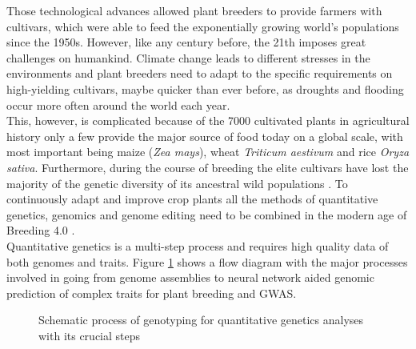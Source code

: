 Those technological advances allowed plant breeders to provide farmers with cultivars,
which were able to feed the exponentially growing world's populations since the
1950s. However, like any century before, the 21th imposes great challenges on
humankind. Climate change leads to different stresses in the environments and plant
breeders need to adapt to the specific requirements on high-yielding cultivars, maybe
quicker than ever before, as droughts and flooding occur more often around the world each
year. \\
This, however, is complicated because of the 7000 cultivated plants in agricultural
history only a few provide the major source of food today on a global scale, with most
important being maize (\textit{Zea mays}), wheat \textit{Triticum aestivum} and rice
\textit{Oryza sativa}.  Furthermore, during the course of breeding the elite cultivars
have lost the majority of the genetic diversity of its ancestral wild populations
\cite{walsh2018}. To continuously adapt and improve crop plants all the methods of
quantitative genetics, genomics and genome editing need to be combined in the modern age of Breeding 4.0 \cite{wallace2018road}. \\
Quantitative genetics is a multi-step process and requires high quality data of both
genomes and traits. Figure \ref{fig:quan_flow1} shows a flow diagram with the major
processes involved in going from genome assemblies to neural network aided genomic
prediction of complex traits for plant breeding and GWAS.
 

\begin{figure}[H]
  \begin{center}
    \caption[Schematic process of genotyping for quantitative genetics]{Schematic process of genotyping for quantitative genetics analyses with its crucial steps} \label{fig:quan_flow1}
  \end{center}     
\end{figure}

